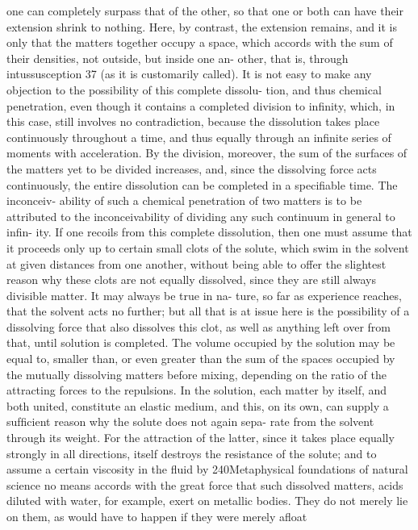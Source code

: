 one can completely surpass that of the other, so that one or both can
have their extension shrink to nothing. Here, by contrast, the extension
remains, and it is only that the matters together occupy a space, which
accords with the sum of their densities, not outside, but inside one an-
other, that is, through intussusception 37 (as it is customarily called). It is
not easy to make any objection to the possibility of this complete dissolu-
tion, and thus chemical penetration, even though it contains a completed
division to inﬁnity, which, in this case, still involves no contradiction,
because the dissolution takes place continuously throughout a time, and
thus equally through an inﬁnite series of moments with acceleration. By
the division, moreover, the sum of the surfaces of the matters yet to be
divided increases, and, since the dissolving force acts continuously, the
entire dissolution can be completed in a speciﬁable time. The inconceiv-
ability of such a chemical penetration of two matters is to be attributed to
the inconceivability of dividing any such continuum in general to inﬁn-
ity. If one recoils from this complete dissolution, then one must assume
that it proceeds only up to certain small clots of the solute, which swim
in the solvent at given distances from one another, without being able
to offer the slightest reason why these clots are not equally dissolved,
since they are still always divisible matter. It may always be true in na-
ture, so far as experience reaches, that the solvent acts no further; but
all that is at issue here is the possibility of a dissolving force that also
dissolves this clot, as well as anything left over from that, until solution
is completed. The volume occupied by the solution may be equal to,
smaller than, or even greater than the sum of the spaces occupied by
the mutually dissolving matters before mixing, depending on the ratio
of the attracting forces to the repulsions. In the solution, each matter
by itself, and both united, constitute an elastic medium, and this, on its
own, can supply a sufﬁcient reason why the solute does not again sepa-
rate from the solvent through its weight. For the attraction of the latter,
since it takes place equally strongly in all directions, itself destroys the
resistance of the solute; and to assume a certain viscosity in the ﬂuid by
240Metaphysical foundations of natural science
no means accords with the great force that such dissolved matters, acids
diluted with water, for example, exert on metallic bodies. They do not
merely lie on them, as would have to happen if they were merely aﬂoat
